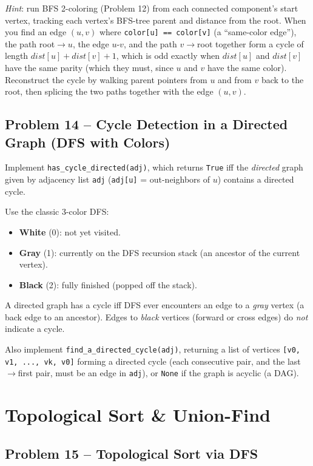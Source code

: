\documentclass[11pt]{article}
\begin{document}
\emph{Hint}: run BFS 2-coloring (Problem 12) from each connected component's start
vertex, tracking each vertex's BFS-tree parent and distance from the root. When you find
an edge $(u,v)$ where \texttt{color[u] == color[v]} (a ``same-color edge''), the path
root$\to u$, the edge $u$-$v$, and the path $v\to$root together form a cycle of length
$dist[u]+dist[v]+1$, which is odd exactly when $dist[u]$ and $dist[v]$ have the same
parity (which they must, since $u$ and $v$ have the same color). Reconstruct the cycle by
walking parent pointers from $u$ and from $v$ back to the root, then splicing the two
paths together with the edge $(u,v)$.

\subsection*{Problem 14 -- Cycle Detection in a Directed Graph (DFS with Colors)}

Implement \texttt{has\_cycle\_directed(adj)}, which returns \texttt{True} iff the
\emph{directed} graph given by adjacency list \texttt{adj} (\texttt{adj[u]} = out-neighbors
of $u$) contains a directed cycle.

Use the classic 3-color DFS:
\begin{itemize}
    \item \textbf{White} (0): not yet visited.
    \item \textbf{Gray} (1): currently on the DFS recursion stack (an ancestor of the
    current vertex).
    \item \textbf{Black} (2): fully finished (popped off the stack).
\end{itemize}

A directed graph has a cycle iff DFS ever encounters an edge to a \emph{gray} vertex (a
back edge to an ancestor). Edges to \emph{black} vertices (forward or cross edges) do
\emph{not} indicate a cycle.

Also implement \texttt{find\_a\_directed\_cycle(adj)}, returning a list of vertices
\texttt{[v0, v1, ..., vk, v0]} forming a directed cycle (each consecutive pair, and the
last$\to$first pair, must be an edge in \texttt{adj}), or \texttt{None} if the graph is
acyclic (a DAG).

\newpage
\section{Topological Sort \& Union-Find}

\subsection*{Problem 15 -- Topological Sort via DFS}
\end{document}
